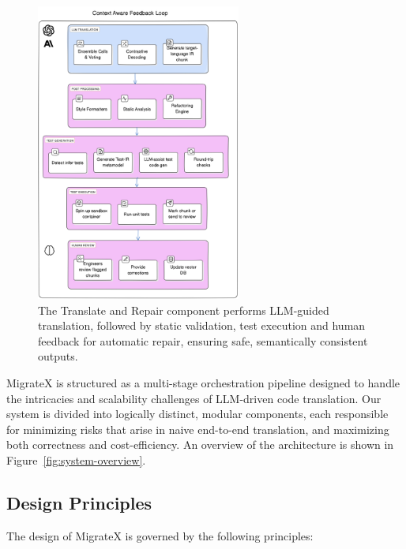 \documentclass[twocolumn]{article}
\begin{document}
\begin{figure}[t]
    \centering
    \includegraphics[width=0.6\textwidth]{figures/system_overview_2.png}
    \caption{{The Translate and Repair component performs LLM-guided translation, followed by static validation, test execution and human feedback for automatic repair, ensuring safe, semantically consistent outputs.}}
    \label{fig:translate-overview}
\end{figure}

MigrateX is structured as a multi-stage orchestration pipeline designed to handle the intricacies and scalability challenges of LLM-driven code translation. Our system is divided into logically distinct, modular components, each responsible for minimizing risks that arise in naive end-to-end translation, and maximizing both correctness and cost-efficiency. An overview of the architecture is shown in Figure~\ref{fig:system-overview}.

\subsection{Design Principles}

The design of MigrateX is governed by the following principles:
\end{document}
